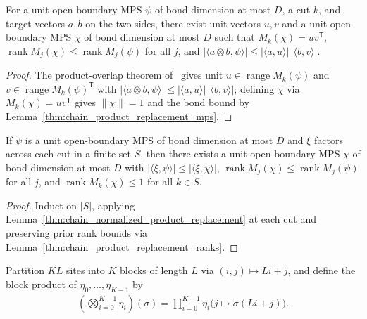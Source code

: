 \begin{lemma}
    \label{thm:chain_normalized_product_replacement}
    \leanok
    For a unit open-boundary MPS $\psi$ of bond dimension at most $D$, a cut
    $k$, and target vectors $a,b$ on the two sides, there exist unit vectors
    $u,v$ and a unit open-boundary MPS $\chi$ of bond dimension at most $D$
    such that $M_k(\chi)=uv^{\mathsf T}$,
    $\operatorname{rank}M_j(\chi)\le\operatorname{rank}M_j(\psi)$ for all $j$,
    and $|\langle a\otimes b,\psi\rangle|\le|\langle a,u\rangle|\,|\langle b,v\rangle|$.
\end{lemma}
\begin{proof}\leanok
    The product-overlap theorem of~\cite{QICLean2026Blueprint} gives unit
    $u\in\operatorname{range}M_k(\psi)$ and
    $v\in\operatorname{range}{M_k(\psi)}^{\mathsf T}$ with
    $|\langle a\otimes b,\psi\rangle|\le|\langle a,u\rangle|\,|\langle b,v\rangle|$;
    defining $\chi$ via $M_k(\chi)=uv^{\mathsf T}$ gives $\|\chi\|=1$ and the
    bond bound by Lemma~\ref{thm:chain_product_replacement_mps}.
\end{proof}

\begin{lemma}
    \label{thm:chain_product_cut_iteration}
    \leanok
    If $\psi$ is a unit open-boundary MPS of bond dimension at most $D$ and
    $\xi$ factors across each cut in a finite set $S$, then there exists a unit
    open-boundary MPS $\chi$ of bond dimension at most $D$ with
    $|\langle\xi,\psi\rangle|\le|\langle\xi,\chi\rangle|$,
    $\operatorname{rank}M_j(\chi)\le\operatorname{rank}M_j(\psi)$ for all $j$,
    and $\operatorname{rank}M_k(\chi)\le1$ for all $k\in S$.
\end{lemma}
\begin{proof}\leanok
    Induct on $|S|$, applying
    Lemma~\ref{thm:chain_normalized_product_replacement} at each cut and
    preserving prior rank bounds via
    Lemma~\ref{thm:chain_product_replacement_ranks}.
\end{proof}

\begin{definition}
    \label{def:chain_copy_product}
    \leanok
    Partition $KL$ sites into $K$ blocks of length $L$ via $(i,j)\mapsto Li+j$,
    and define the block product of $\eta_0,\dots,\eta_{K-1}$ by
    \begin{align}
        \label{eq:chain_copy_product_coefficients}
        \left(\bigotimes_{i=0}^{K-1}\eta_i\right)(\sigma)
        =\prod_{i=0}^{K-1}\eta_i\bigl(j\mapsto\sigma(Li+j)\bigr).
    \end{align}
\end{definition}


